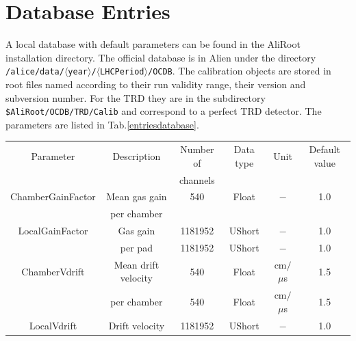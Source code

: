 \documentclass{alicetdr}
\begin{document}
\section{Database Entries}
A local database with default parameters can be found in the AliRoot
installation directory. The official database is in Alien under the
directory
{\tt /alice/data/$\langle$year$\rangle$/$\langle$LHCPeriod$\rangle$/OCDB}.
The calibration objects are stored in root files named according to their
run validity range, their version and subversion number. For the TRD they
are in the subdirectory {\tt \$AliRoot/OCDB/TRD/Calib} and correspond to
a perfect TRD detector. The parameters are listed in Tab.\ref{entriesdatabase}.\\
\begin{table} [h]
  \begin{center}
    \begin{tabular}{|c|c|c|c|c|c|}
      \hline Parameter                  & Description                                        & Number of         & Data type  & Unit & Default value \\
                                        &                                                    & channels          &            &  &  \\ \hline
      ChamberGainFactor                 & Mean gas gain                                      & 540               & Float      & $-$  & 1.0          \\
      $ $                               & per chamber                                        &                   &            &  &          \\ \hline
      LocalGainFactor                   & Gas gain                                           & 1181952           & UShort     & $-$  & 1.0   \\
                                        & per pad                                            & 1181952           & UShort     & $-$  & 1.0   \\ \hline
      ChamberVdrift                     & Mean drift velocity                                & 540               & Float      & cm$/$$\mu$s & 1.5 \\
                                        & per chamber                                        & 540               & Float      & cm$/$$\mu$s & 1.5 \\ \hline
      LocalVdrift                       & Drift velocity                                     & 1181952           & UShort     & $-$ & 1.0  \\

\end{tabular}
\end{center}
\end{table}
\end{document}
